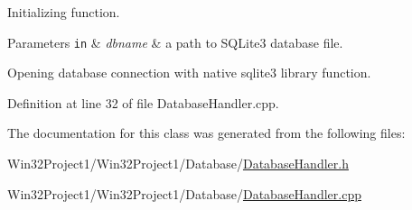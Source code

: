 Initializing function. 


\begin{DoxyParams}[1]{Parameters}
\mbox{\tt in}  & {\em dbname} & a path to S\+Q\+Lite3 database file. \\
\hline
\end{DoxyParams}
Opening database connection with native sqlite3 library function.

Definition at line 32 of file Database\+Handler.\+cpp.



The documentation for this class was generated from the following files\+:\begin{DoxyCompactItemize}
\item 
Win32\+Project1/\+Win32\+Project1/\+Database/\hyperlink{_database_handler_8h}{Database\+Handler.\+h}\item 
Win32\+Project1/\+Win32\+Project1/\+Database/\hyperlink{_database_handler_8cpp}{Database\+Handler.\+cpp}\end{DoxyCompactItemize}
